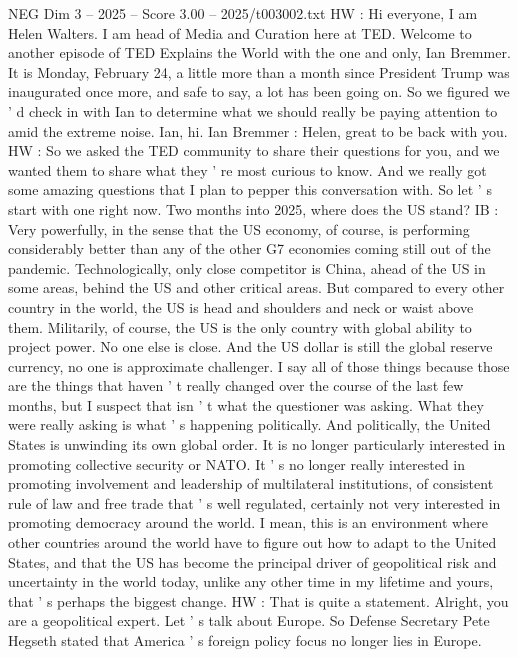 \begin{textsample}{NEG Dim 3 – 2025 – Score 3.00 – 2025/t003002.txt}  \label{ex:f3_neg_057}
HW : Hi everyone, I am Helen Walters.
I am head of Media and Curation here at TED.
Welcome to another episode of TED Explains the World with the one and only, Ian Bremmer.
It is Monday, February 24, a little more than a month since President Trump was inaugurated once more, and safe to say, a lot has been going on.
So we figured we ' d check in with Ian to determine what we should really be paying attention to amid the extreme noise.
Ian, hi.
Ian Bremmer : Helen, great to be back with you.
HW : So we asked the TED community to share their questions for you, and we wanted them to share what they ' re most curious to know.
And we really got some amazing questions that I plan to pepper this conversation with.
So let ' s start with one right now.
Two months into 2025, where does the US stand?
IB : Very powerfully, in the sense that the US economy, of course, is performing considerably better than any of the other G7 economies coming still out of the pandemic.
Technologically, only close competitor is China, ahead of the US in some areas, behind the US and other critical areas.
But compared to every other country in the world, the US is head and shoulders and neck or waist above them.
Militarily, of course, the US is the only country with global ability to project power.
No one else is close.
And the US dollar is still the global reserve currency, no one is approximate challenger.
I say all of those things because those are the things that haven ' t really changed over the course of the last few months, but I suspect that isn ' t what the questioner was asking.
What they were really asking is what ' s happening politically.
And politically, the United States is unwinding its own global order.
It is no longer particularly interested in promoting collective security or NATO.
It ' s no longer really interested in promoting involvement and leadership of multilateral institutions, of consistent rule of law and free trade that ' s well regulated, certainly not very interested in promoting democracy around the world.
I mean, this is an environment where other countries around the world have to figure out how to adapt to the United States, and that the US has become the principal driver of geopolitical risk and uncertainty in the world today, unlike any other time in my lifetime and yours, that ' s perhaps the biggest change.
HW : That is quite a statement.
Alright, you are a geopolitical expert.
Let ' s talk about Europe.
So Defense Secretary Pete Hegseth stated that America ' s foreign policy focus no longer lies in Europe.

\end{textsample}
